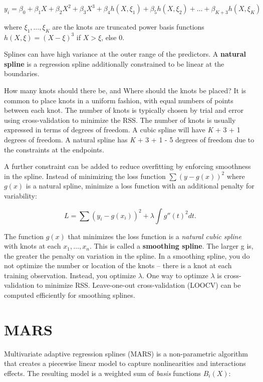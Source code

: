 \documentclass[
]{book}
\begin{document}
\[y_i = \beta_0 + \beta_1X + \beta_2X^2 + \beta_3X^3 + \beta_4h(X, \xi_1) + \beta_5h(X, \xi_2) + \dots + \beta_{K+3}h(X, \xi_K)\]

where \(\xi_1, \dots, \xi_K\) are the knots are truncated power basis functions \(h(X, \xi) = (X - \xi)^3\) if \(X > \xi\), else 0.

Splines can have high variance at the outer range of the predictors. A \textbf{natural spline} is a regression spline additionally constrained to be linear at the boundaries.

How many knots should there be, and Where should the knots be placed? It is common to place knots in a uniform fashion, with equal numbers of points between each knot. The number of knots is typically chosen by trial and error using cross-validation to minimize the RSS. The number of knots is usually expressed in terms of degrees of freedom. A cubic spline will have \emph{K} + 3 + 1 degrees of freedom. A natural spline has \emph{K} + 3 + 1 - 5 degrees of freedom due to the constraints at the endpoints.

A further constraint can be added to reduce overfitting by enforcing smoothness in the spline. Instead of minimizing the loss function \(\sum{(y - g(x))^2}\) where \(g(x)\) is a natural spline, minimize a loss function with an additional penalty for variability:

\[L = \sum{(y_i - g(x_i))^2 + \lambda \int g''(t)^2dt}.\]

The function \(g(x)\) that minimizes the loss function is a \emph{natural cubic spline} with knots at each \(x_1, \dots, x_n\). This is called a \textbf{smoothing spline}. The larger g is, the greater the penalty on variation in the spline. In a smoothing spline, you do not optimize the number or location of the knots -- there is a knot at each training observation. Instead, you optimize \(\lambda\). One way to optimze \(\lambda\) is cross-validation to minimize RSS. Leave-one-out cross-validation (LOOCV) can be computed efficiently for smoothing splines.

\hypertarget{mars}{%
\section{MARS}\label{mars}}

Multivariate adaptive regression splines (MARS) is a non-parametric algorithm that creates a piecewise linear model to capture nonlinearities and interactions effects. The resulting model is a weighted sum of \emph{basis} functions \(B_i(X)\):
\end{document}
